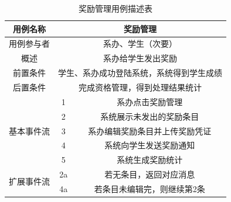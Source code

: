 \documentclass[12pt, a4paper, oneside]{ctexart}
\begin{document}
\begin{table}[H]
    \centering
    \begin{tabular}{|c|cc|}
    \hline
    用例名称                   & \multicolumn{2}{c|}{奖励管理}                 \\ \hline
    用例参与者                  & \multicolumn{2}{c|}{系办、学生（次要）}            \\ \hline
    概述                     & \multicolumn{2}{c|}{系办给学生发出奖励}            \\ \hline
    前置条件                   & \multicolumn{2}{c|}{学生、系办成功登陆系统，系统得到学生成绩} \\ \hline
    后置条件                   & \multicolumn{2}{c|}{完成资格管理，得到处理结果统计}      \\ \hline
    \multirow{5}{*}{基本事件流} & \multicolumn{1}{c|}{1}  & 系办点击奖励管理        \\ \cline{2-3} 
                           & \multicolumn{1}{c|}{2}  & 系统展示未发出的奖励条目    \\ \cline{2-3} 
                           & \multicolumn{1}{c|}{3}  & 系办编辑奖励条目并上传奖励凭证 \\ \cline{2-3} 
                           & \multicolumn{1}{c|}{4}  & 系统向学生发送奖励通知     \\ \cline{2-3} 
                           & \multicolumn{1}{c|}{5}  & 系统生成奖励统计        \\ \hline
    \multirow{2}{*}{扩展事件流} & \multicolumn{1}{c|}{2a} & 若无条目，返回对应消息     \\ \cline{2-3} 
                           & \multicolumn{1}{c|}{4a} & 若条目未编辑完，则继续第2条  \\ \hline
    \end{tabular}
    \caption{奖励管理用例描述表}
\end{table}
\end{document}
